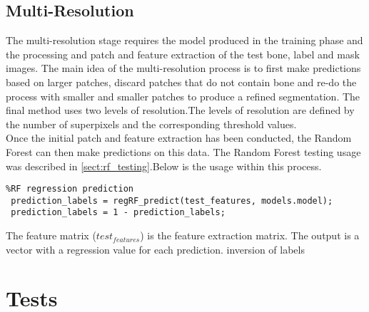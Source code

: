 \subsection{Multi-Resolution} 
The multi-resolution stage requires the model produced in the training phase and the processing and patch and feature extraction of the test bone, label and mask images. The main idea of the multi-resolution process is to first make predictions based on larger patches, discard patches that do not contain bone and re-do the process with smaller and smaller patches to produce a refined segmentation.  The final method uses two levels of resolution.The levels of resolution are defined by the number of superpixels and the corresponding threshold values. 
\\[1\baselineskip]
Once the initial patch and feature extraction has been conducted, the Random Forest can then make predictions on this data. The Random Forest testing usage was described in \ref{sect:rf_testing}.Below is the usage within this process. 
\begin{lstlisting}
%RF regression prediction
 prediction_labels = regRF_predict(test_features, models.model);
 prediction_labels = 1 - prediction_labels;
\end{lstlisting}
The feature matrix ($test_{features}$) is the feature extraction matrix. The output is a vector with a regression value for each prediction.
inversion of labels




\section{Tests}